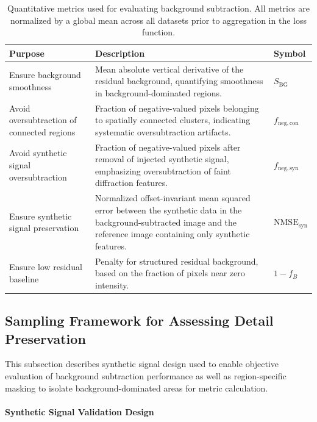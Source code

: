 \documentclass[iucr]{iucrjournals}
\begin{document}
\begin{table}[t]
\caption{Quantitative metrics used for evaluating background subtraction. 
All metrics are normalized by a global mean across all datasets prior to aggregation in the loss function.}
\label{tab:loss_terms}
\centering
\small
\setlength{\tabcolsep}{6pt}
\renewcommand{\arraystretch}{1.1}
\begin{tabular}{@{}p{3.5cm}p{9.0cm}p{1.5cm}@{}}
\toprule
\textbf{Purpose} & \textbf{Description} & \textbf{Symbol} \\
\midrule
Ensure background smoothness  & Mean absolute vertical derivative of the residual background, quantifying smoothness in background-dominated regions. & $S_{\mathrm{BG}}$ \\
Avoid oversubtraction of connected regions & Fraction of negative-valued pixels belonging to spatially connected clusters, indicating systematic oversubtraction artifacts. & $f_{\mathrm{neg,con}}$ \\
Avoid synthetic signal oversubtraction & Fraction of negative-valued pixels after removal of injected synthetic signal, emphasizing oversubtraction of faint diffraction features. & $f_{\mathrm{neg,syn}}$ \\
Ensure synthetic signal preservation & Normalized offset-invariant mean squared error between the synthetic data in the background-subtracted image and the reference image containing only synthetic features.& $\mathrm{NMSE}_{\mathrm{syn}}$  \\
Ensure low residual baseline & Penalty for structured residual background, based on the fraction of pixels near zero intensity. & $1 - f_{B}$ \\
\bottomrule
\end{tabular}
\end{table}




\subsection{Sampling Framework for Assessing Detail Preservation}

This subsection describes synthetic signal design used to enable objective evaluation of background subtraction performance as well as region-specific masking to isolate background-dominated areas for metric calculation.

\paragraph{Synthetic Signal Validation Design}
\end{document}
